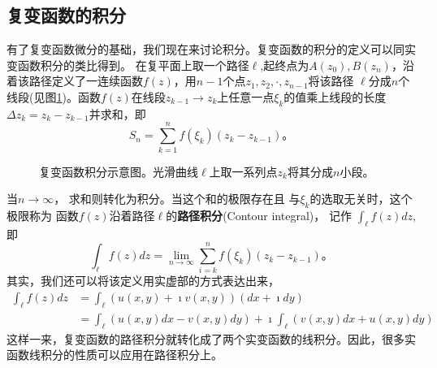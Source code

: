 \subsection[定义和性质]{复变函数的积分}
有了复变函数微分的基础，我们现在来讨论积分。复变函数的积分的定义可以同实变函数积分的类比得到。
在复平面上取一个路径$\ell$,起终点为$A(z_0),B(z_n)$，沿着该路径定义了一连续函数$f(z)$，用$n-1$个点$z_1, z_2,\cdot, z_{n-1}$将该路径
$\ell$分成$n$个线段(见图\ref{fig:complex_integral})。函数$f(z)$在线段$z_{k-1}\rightarrow z_{k}$上任意一点$\xi_k$的值乘上线段的长度$\Delta z_k = z_k - z_{k-1}$并求和，即
\begin{equation}
    S_n = \sum_{k=1}^{n} f(\xi_k) (z_{k} - z_{k-1}) \textrm{。}
\end{equation}
\begin{figure}[htbp]
    \centering
    
    \caption{复变函数积分示意图。光滑曲线$\ell$上取一系列点$z_k$将其分成$n$小段。}
    \label{fig:complex_integral}
\end{figure}
当$n\to \infty$， 求和则转化为积分。当这个和的极限存在且
与$\xi_k$的选取无关时，这个极限称为
函数$f(z)$沿着路径$\ell$的\textbf{路径积分}(Contour integral)， 记作
$\int_{\ell} f(z) dz$,即
\begin{equation}
    \int_{\ell} f(z) dz = \lim_{n\to \infty} \sum_{i=k}^{n} f(\xi_k) (z_{k} - z_{k-1}) \textrm{。} 
\end{equation}
其实，我们还可以将该定义用实虚部的方式表达出来，
\begin{align}
    \int_{\ell} f(z) dz  & = \int_{\ell} \left( u(x,y) + \imath v(x,y) \right) (dx + \imath dy) 
    \\
    & = \int_{\ell} \left( u(x,y) dx  -  v(x,y) dy \right) + \imath \int_{\ell}  \left( v(x,y) dx  + u(x,y)dy \right) 
\end{align}
这样一来，复变函数的路径积分就转化成了两个实变函数的线积分。因此，很多实函数线积分的性质可以应用在路径积分上。


